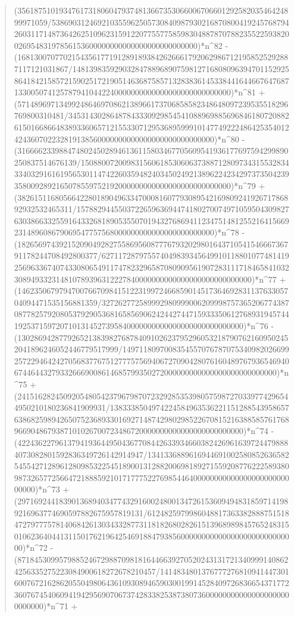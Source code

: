 \documentclass[11pt,a4paper]{article}
\theoremstyle{plain}
\theoremstyle{definition}
\begin{document}
\begin{quote}
(3561875101934761731806047937481366735306600670660129258203546424899971059/53869031246921035596250573084098793021687080041924576879426031171487364262510962315912207755775859830488787078823552259382002695483197856153600000000000000000000000000)*n\^{}82 - (168130070770215435617719128918938426266617920629867121958525292887117121031867/14813983592903284788968907598127168080963947011529258641842158572159025172190514636875857132838361453384416446676476871330050741257879410442240000000000000000000000000000)*n\^{}81 + (57148969713499248646970862138966173706858582348648097239535518296769800310481/34531430286487843330929854541088969885696846180720882615016686648389336065712155330712953689599910147749222486425354012424360702232819138560000000000000000000000000000)*n\^{}80 - (31666623398847480245028946136115803467705609541936177697594299890250837514676139/150880072009831560618530606373887128097343155328343340329161619565301147422603594824034502492138962242342973735042393580092892165078559752192000000000000000000000000000)*n\^{}79 + (3826151168056642280189049633470008160779308954216980924192671786892932532465311/157882944550372265963694474180270074971059504309827630386633255916433268189053550701943276869411234751481255216415669231489608679069547757568000000000000000000000000)*n\^{}78 - (1826569743921520904928275586956087776793202980164371054154666736791178244708492800377/627117287975574049839345649910118801077481419256963367407433080654911747823296587080909561907283111718465841032308949332314810789396312227840000000000000000000000000000)*n\^{}77 + (1462350679794700766709841512231997246685901451736469283113763305704094471535156881359/3272627725899929809990062099987573652067743870877825792080537929053681658569062424427447159333506127689319457441925371597207101314527395840000000000000000000000000000)*n\^{}76 - (130286942877926521383982768784091026237952960532187907621609502452041896246052446779517999/1497118097008354557076787075340982026699257229464242705683776751277757569406727090428076160489767936546940674464432793326669008614685799350272000000000000000000000000000)*n\^{}75 + (241516282450920548054237967987072329285353980575987270339774296544950210180236841909931/13833385049742245849635362211512885439586576386825989426507523689330169271487429802985226708152163885857617689669048679387101026700723486720000000000000000000000000)*n\^{}74 - (422436227961379419364495043677084426339346603824269616397244798884073082801592836349726142914947/134133688961694469100258085263658254554271289612809853225451890013128820069818927155920877622258938098732657725664721888592101717775227698544640000000000000000000000000000)*n\^{}73 + (297169244183901368940347743291600248001347261536094948318597141989216963774690597882675957819131/612482597998604881736338288875151847279777578140684261303433287731181826802826151396898984576524831501062364044131150176219642546918847938560000000000000000000000000000)*n\^{}72 - (871845309957988524672988709818164466392705202431317213409991408624256335275223084900618272678210457/14148348013767772768109414473016007672162862055049806436109308946590300199145284097268366543717723607674540609419429569070673742833825387380736000000000000000000000000000)*n\^{}71 + 
\end{quote}
\end{document}
